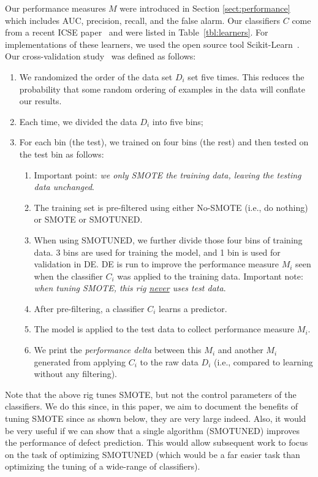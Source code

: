 \documentclass[sigconf,review, anonymous]{acmart}
\newcommand{\be}{\begin{enumerate}}
\newcommand{\ee}{\end{enumerate}}
\theoremstyle{break}
\theoremstyle{break}
\newcommand{\tion}[1]{{Section }\ref{sect:#1}}
\newcommand{\sma}{{\sc SMOTE}}
\newcommand{\smb}{{\sc SMOTUNED}}
\begin{document}
Our performance measures $M$ were introduced in \tion{performance}
which includes   AUC, precision, recall, and the  false alarm. 
Our classifiers
 $C$  come from a  recent ICSE paper~\cite{ghotra2015revisiting}
and were listed in  Table~\ref{tbl:learners}.
For  implementations 
of these learners,
we used  the open source tool
Scikit-Learn~\cite{pedregosa2011scikit}.
Our  cross-validation study~\cite{refaeilzadeh2009cross} was defined as follows:
\be
\item We randomized the order of the data set $D_i$ set five times. This reduces the probability
that some random ordering of examples in the data will conflate our results.
\item Each time, we divided the data $D_i$ into five bins;
\item For each bin (the test), we trained on four bins (the rest) and then tested
on the test bin as follows:
\be
\item
Important point: {\em we only {\sma} the training data,  leaving
the  testing data unchanged}.
\item
The  training set is pre-filtered using either No-SMOTE (i.e., do nothing) or  {\sma} or {\smb}.  
\item
When using {\smb}, we further divide those four bins of training data. 3 bins are used for training the model, and 1 bin is used for validation in DE. DE is  run to  improve
the performance measure $M_i$ seen when the classifier $C_i$ was applied to the training data.
Important note: {\em when tuning {\sma}, this rig \underline{{\em never}} uses test data}.
\item
After pre-filtering, a classifier $C_i$  learns a predictor.
\item
The model is applied to the test data to collect performance measure $M_i$. 
\item 
We print the {\em performance delta} between this $M_i$ and another  $M_i$
generated from applying $C_i$ to the raw data $D_i$ (i.e., compared to learning
without any filtering).
\ee
\ee


   
   
Note that the above rig tunes {\sma}, but not the control parameters of the classifiers.
We do this since, in this paper,  we aim to document the   benefits of tuning {\sma} since as shown below, they are very large indeed. Also, it would be very useful if we can show that a single algorithm ({\smb})  improves the performance of defect prediction. This would allow
subsequent work to focus on the task of optimizing  {\smb} (which would be a far easier
task than optimizing the tuning of a wide-range of classifiers). 
 
\end{document}
